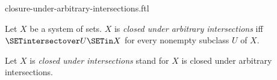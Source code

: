 \documentclass{stex}
\begin{document}
\begin{smodule}{closure-under-arbitrary-intersections.ftl}

\begin{definition}[forthel,id=FOUNDATIONS_14_2369621166391296]
  Let $X$ be a system of sets.
  $X$ is \emph{closed under arbitrary intersections} iff $\SETintersectover U \SETin X$ for every nonempty subclass $U$ of $X$.

  Let $X$ is \emph{closed under intersections} stand for $X$ is closed under arbitrary intersections.
\end{definition}
\end{smodule}
\end{document}
